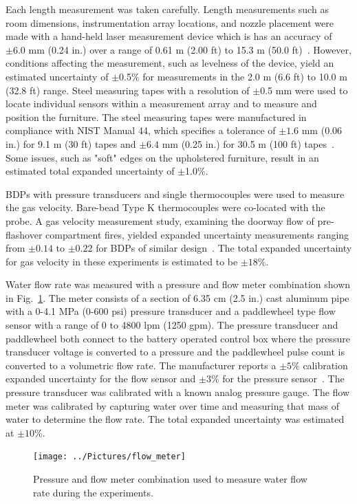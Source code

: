 \documentclass[12pt,oneside]{book}
\begin{document}
Each length measurement was taken carefully. Length measurements such as room dimensions,
instrumentation array locations, and nozzle placement were made with a hand-held laser measurement device which is has an accuracy of $\pm6.0$ mm (0.24 in.) over a range of 0.61 m (2.00 ft) to 15.3 m (50.0 ft)~\cite{Stanley}. However, conditions affecting the measurement, such as levelness of the device, yield an estimated uncertainty of $\pm$0.5\% for measurements in the 2.0 m (6.6 ft) to 10.0 m (32.8 ft) range. Steel measuring tapes with a resolution of $\pm$0.5 mm were used to locate individual sensors within a measurement array and to measure and position the furniture. The steel measuring tapes were manufactured in compliance with NIST Manual 44, which specifies a tolerance of $\pm1.6$ mm (0.06 in.) for 9.1 m (30 ft) tapes and $\pm6.4$ mm (0.25 in.) for 30.5 m (100 ft) tapes~\cite{NIST_Manual_44}. Some issues, such as "soft" edges on the upholstered furniture, result in an estimated total expanded uncertainty of $\pm$1.0\%. 

BDPs with pressure transducers and single thermocouples were used to measure the gas velocity. Bare-bead Type K thermocouples were co-located with the probe. A gas velocity measurement study, examining the doorway flow of pre-flashover compartment fires, yielded expanded uncertainty measurements ranging from $\pm0.14$ to $\pm0.22$ for BDPs of similar design~\cite{Bryant:FSJ2009}. The total expanded uncertainty for gas velocity in these experiments is estimated to be $\pm18$\%.   

Water flow rate was measured with a pressure and flow meter combination shown in Fig.~\ref{fig:flow_meter}. The meter consists of a section of 6.35 cm (2.5 in.) cast aluminum pipe with a 0-4.1 MPa (0-600 psi) pressure transducer and a paddlewheel type flow sensor with a range of 0 to 4800 lpm (1250 gpm). The pressure transducer and paddlewheel both connect to the battery operated control box where the pressure transducer voltage is converted to a pressure and the paddlewheel pulse count is converted to a volumetric flow rate. The manufacturer reports a $\pm5$\% calibration expanded uncertainty for the flow sensor and $\pm3$\%  for the pressure sensor~\cite{Akron}. The pressure transducer was calibrated with a known analog pressure gauge. The flow meter was calibrated by capturing water over time and measuring that mass of water to determine the flow rate. The total expanded uncertainty was estimated at $\pm10$\%. 

\begin{figure}[!ht]
\texttt{[image: ../Pictures/flow\_meter]}
\caption[Flow meter used to measure flow rate during experiments.]{Pressure and flow meter combination used to measure water flow rate during the experiments.}
\label{fig:flow_meter}
\end{figure}
\FloatBarrier
\end{document}
